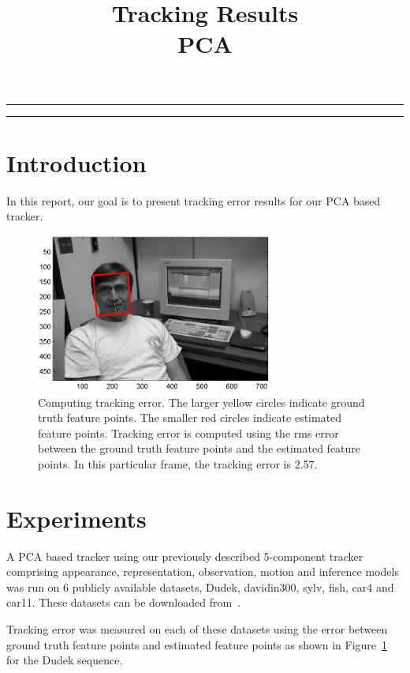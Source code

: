 
\title{Tracking Results\\PCA}
\date{}

\maketitle
\rule[0pt]{\textwidth}{1pt}
\tableofcontents
\rule[0pt]{\textwidth}{1pt}
\section{Introduction}
In this report, our goal is to present tracking error results for our PCA based tracker.

								\begin{figure}[t]
								\centering
								\includegraphics[width=0.7\textwidth]{temp/results_pca__trk_dudek_0007.png}
								\caption{Computing tracking error.  The larger yellow circles indicate ground truth feature points.  The smaller red circles indicate estimated feature points.  Tracking error is computed using the rms error between the ground truth feature points and the estimated feature points.  In this particular frame, the tracking error is 2.57.}
								\label{fig:results_pca__trk_dudek_0007}
								\end{figure}
\section{Experiments}
A PCA based tracker using our previously described 5-component tracker comprising appearance, representation, observation, motion and inference models was run on 6 publicly available datasets, Dudek, davidin300, sylv, fish, car4 and car11.  These datasets can be downloaded from~\cite{2008_JNL_subspaceTRK_Ross}.

Tracking error was measured on each of these datasets using the error between ground truth feature points and estimated feature points as shown in Figure~\ref{fig:results_pca__trk_dudek_0007} for the Dudek sequence.


